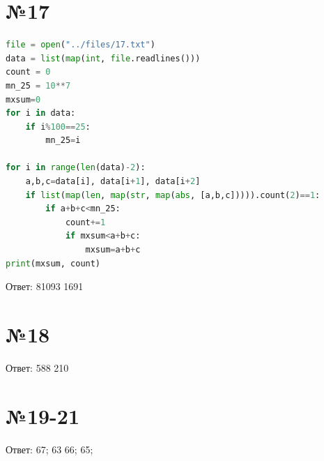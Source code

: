 \documentclass[14pt]{extarticle}
\begin{document}
\section{№17}

\begin{lstlisting}[language=Python]
file = open("../files/17.txt")
data = list(map(int, file.readlines()))
count = 0
mn_25 = 10**7
mxsum=0
for i in data:
    if i%100==25:
        mn_25=i

for i in range(len(data)-2):
    a,b,c=data[i], data[i+1], data[i+2]
    if list(map(len, map(str, map(abs, [a,b,c])))).count(2)==1:
        if a+b+c<mn_25:
            count+=1
            if mxsum<a+b+c:
                mxsum=a+b+c
print(mxsum, count)
\end{lstlisting}

Ответ: 81093 1691
\section{№18}
Ответ: 588 210
\section{№19-21}
Ответ: 
67;
63 66;
65;
\end{document}
